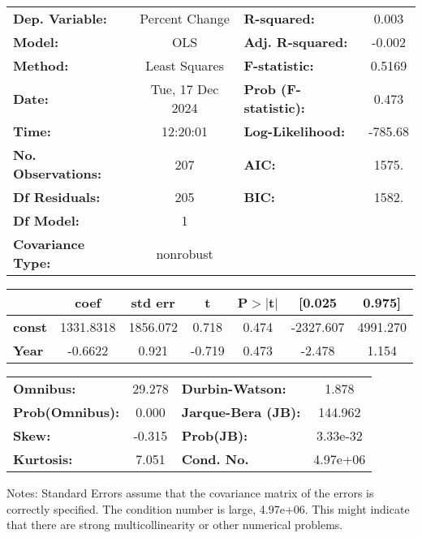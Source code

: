 \begin{center}
\begin{tabular}{lclc}
\toprule
\textbf{Dep. Variable:}    &  Percent Change  & \textbf{  R-squared:         } &     0.003   \\
\textbf{Model:}            &       OLS        & \textbf{  Adj. R-squared:    } &    -0.002   \\
\textbf{Method:}           &  Least Squares   & \textbf{  F-statistic:       } &    0.5169   \\
\textbf{Date:}             & Tue, 17 Dec 2024 & \textbf{  Prob (F-statistic):} &    0.473    \\
\textbf{Time:}             &     12:20:01     & \textbf{  Log-Likelihood:    } &   -785.68   \\
\textbf{No. Observations:} &         207      & \textbf{  AIC:               } &     1575.   \\
\textbf{Df Residuals:}     &         205      & \textbf{  BIC:               } &     1582.   \\
\textbf{Df Model:}         &           1      & \textbf{                     } &             \\
\textbf{Covariance Type:}  &    nonrobust     & \textbf{                     } &             \\
\bottomrule
\end{tabular}
\begin{tabular}{lcccccc}
               & \textbf{coef} & \textbf{std err} & \textbf{t} & \textbf{P$> |$t$|$} & \textbf{[0.025} & \textbf{0.975]}  \\
\midrule
\textbf{const} &    1331.8318  &     1856.072     &     0.718  &         0.474        &    -2327.607    &     4991.270     \\
\textbf{Year}  &      -0.6622  &        0.921     &    -0.719  &         0.473        &       -2.478    &        1.154     \\
\bottomrule
\end{tabular}
\begin{tabular}{lclc}
\textbf{Omnibus:}       & 29.278 & \textbf{  Durbin-Watson:     } &    1.878  \\
\textbf{Prob(Omnibus):} &  0.000 & \textbf{  Jarque-Bera (JB):  } &  144.962  \\
\textbf{Skew:}          & -0.315 & \textbf{  Prob(JB):          } & 3.33e-32  \\
\textbf{Kurtosis:}      &  7.051 & \textbf{  Cond. No.          } & 4.97e+06  \\
\bottomrule
\end{tabular}
\end{center}

Notes: \newline
 [1] Standard Errors assume that the covariance matrix of the errors is correctly specified. \newline
 [2] The condition number is large, 4.97e+06. This might indicate that there are \newline
 strong multicollinearity or other numerical problems.